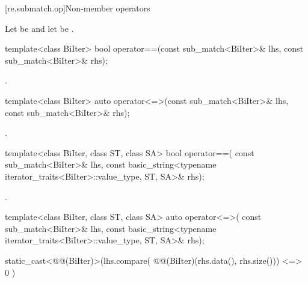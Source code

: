 [re.submatch.op]{Non-member operators}

\pnum
Let  be
 and
let  be
.

%
\begin{itemdecl}
template<class BiIter>
  bool operator==(const sub_match<BiIter>& lhs, const sub_match<BiIter>& rhs);
\end{itemdecl}

\begin{itemdescr}
\pnum
\returns
{}.
\end{itemdescr}

%
\begin{itemdecl}
template<class BiIter>
  auto operator<=>(const sub_match<BiIter>& lhs, const sub_match<BiIter>& rhs);
\end{itemdecl}

\begin{itemdescr}
\pnum
\returns
{}.
\end{itemdescr}

%
\begin{itemdecl}
template<class BiIter, class ST, class SA>
  bool operator==(
    const sub_match<BiIter>& lhs,
    const basic_string<typename iterator_traits<BiIter>::value_type, ST, SA>& rhs);
\end{itemdecl}

\begin{itemdescr}
\pnum
\returns
{}.
\end{itemdescr}

%
\begin{itemdecl}
template<class BiIter, class ST, class SA>
  auto operator<=>(
    const sub_match<BiIter>& lhs,
    const basic_string<typename iterator_traits<BiIter>::value_type, ST, SA>& rhs);
\end{itemdecl}

\begin{itemdescr}
\pnum
\returns
\begin{codeblock}
static_cast<@@(BiIter)>(lhs.compare(
  @@(BiIter)(rhs.data(), rhs.size()))
    <=> 0
  )
\end{codeblock}
\end{itemdescr}

